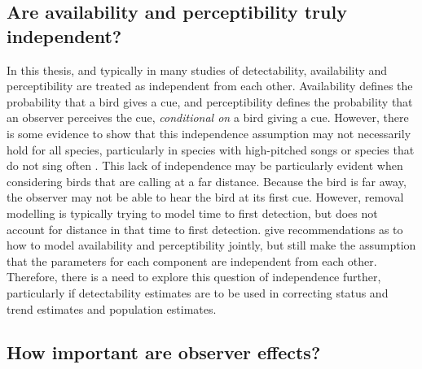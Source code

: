 \subsection{Are availability and perceptibility truly independent?}

\par In this thesis, and typically in many studies of detectability, availability and perceptibility are treated as independent from each other.
Availability defines the probability that a bird gives a cue, and perceptibility defines the probability that an observer perceives the cue, \textit{conditional on} a bird giving a cue.
However, there is some evidence to show that this independence assumption may not necessarily hold for all species, particularly in species with high-pitched songs or species that do not sing often \citep{martin-schwarze_joint_2021}.
This lack of independence may be particularly evident when considering birds that are calling at a far distance.
Because the bird is far away, the observer may not be able to hear the bird at its first cue.
However, removal modelling is typically trying to model time to first detection, but does not account for distance in that time to first detection.
\citep{solymos_calibrating_2013} give recommendations as to how to model availability and perceptibility jointly, but still make the assumption that the parameters for each component are independent from each other.
Therefore, there is a need to explore this question of independence further, particularly if detectability estimates are to be used in correcting status and trend estimates and population estimates.

\subsection{How important are observer effects?}

